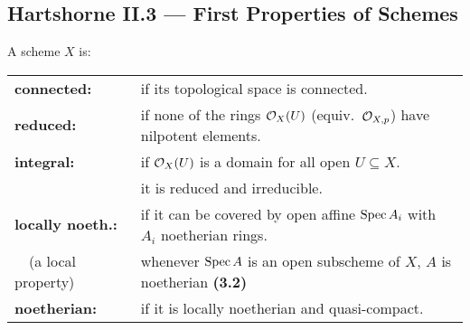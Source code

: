 \documentclass[11pt]{article}
\newcommand{\Index}[1]{\index{#1}#1}
\newcommand{\indexThm}[1]{\index{Hartshorne!Theorems, etc.!#1}}
\newcommand{\Entry}[3][notcustom]{\Bullet
\ifthenelse{\equal{#1}{}}{}
{
\ifthenelse{\equal{#1}{notcustom}}{\index{#2}}{\index{#1}}
}
 \textbf{#2:}&#3}
\begin{document}
\begin{II.3 First Properties of Schemes}
\section*{Hartshorne II.3 --- First Properties of Schemes}
\begin{itemise}
\item A scheme $X$ is:\\
\begin{tabular}{p{}p{}}
\Entry{connected}{if its topological space is connected.}\\
\Entry{reduced}{if none of the rings $\mathcal{O}_X(U)$ (equiv.\ $\mathcal{O}_{X,p}$) have
nilpotent elements.}\\
\Entry{integral}{if $\mathcal{O}_X(U)$ is a domain for all open $U\subseteq X$.\\&
\Iff it is reduced and irreducible.}\\
\Entry[locally noetherian]{locally noeth.}{if it can be covered by open affine
$\operatorname{Spec} A_i$ with $A_i$ noetherian rings.\\{\ \ \small(a local property)}&
\Iff whenever $\operatorname{Spec} A$ is an open subscheme of $X$, $A$ is
noetherian\indexThm{II.3.2} \textbf{(3.2)}}\\
\Entry{noetherian}{if it is locally noetherian and quasi-compact.}
\end{tabular}
%
%

\end{itemise}
\end{II.3 First Properties of Schemes}
\end{document}
